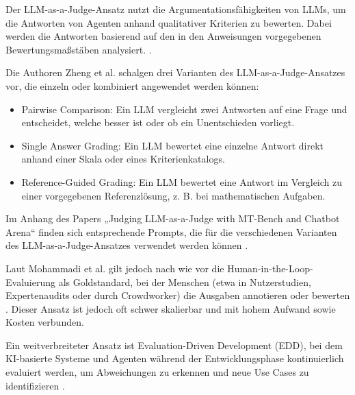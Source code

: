 Der LLM-as-a-Judge-Ansatz nutzt die Argumentationsfähigkeiten von LLMs, um die Antworten von Agenten anhand
qualitativer Kriterien zu bewerten. Dabei werden die Antworten basierend auf
den in den Anweisungen vorgegebenen Bewertungsmaßstäben analysiert. \cite[p.~7]{mohammadiEvaluationBenchmarkingLLM2025}.

Die Authoren Zheng et al. \cite[p. 4]{zhengJudgingLLMasaJudgeMTBench2023} schalgen drei Varianten des
LLM-as-a-Judge-Ansatzes vor, die einzeln oder kombiniert angewendet werden können:
\begin{itemize}
  \item Pairwise Comparison: Ein LLM vergleicht zwei Antworten auf eine Frage und entscheidet, welche besser
    ist oder ob ein Unentschieden vorliegt.
  \item Single Answer Grading: Ein LLM bewertet eine einzelne Antwort direkt anhand einer Skala oder eines
    Kriterienkatalogs.
  \item Reference-Guided Grading: Ein LLM bewertet eine Antwort im Vergleich zu einer vorgegebenen
    Referenzlösung, z. B. bei mathematischen Aufgaben.
\end{itemize}

Im Anhang des Papers „Judging LLM-as-a-Judge with MT-Bench and Chatbot Arena“ finden sich entsprechende
Prompts, die für die verschiedenen Varianten des LLM-as-a-Judge-Ansatzes verwendet werden können
\cite{zhengJudgingLLMasaJudgeMTBench2023}.

Laut Mohammadi et al. gilt jedoch nach wie vor die Human-in-the-Loop-Evaluierung als Goldstandard, bei der
Menschen (etwa in Nutzerstudien, Expertenaudits oder durch Crowdworker) die Ausgaben annotieren oder
bewerten \cite[p.~7]{mohammadiEvaluationBenchmarkingLLM2025}. Dieser Ansatz ist jedoch oft schwer skalierbar
und mit hohem Aufwand sowie Kosten verbunden.

Ein weitverbreiteter Ansatz ist Evaluation-Driven Development (EDD), bei dem KI-basierte Systeme und Agenten
während der Entwicklungsphase kontinuierlich evaluiert werden, um Abweichungen zu erkennen und neue Use Cases
zu identifizieren \cite[p.~6]{mohammadiEvaluationBenchmarkingLLM2025}.